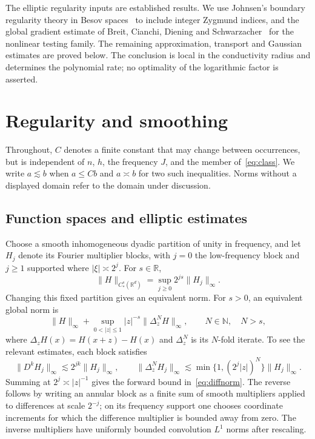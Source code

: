 \documentclass[11pt]{article}
\theoremstyle{remark}
\newcommand{\R}{\mathbb R}
\newcommand{\norm}[1]{\lVert #1\rVert}
\newcommand{\abs}[1]{\lvert #1\rvert}
\begin{document}
The elliptic regularity inputs are established results. We use Johnsen's boundary regularity theory in Besov spaces~\cite[Theorem~5.2 and Corollary~1.2]{Johnsen} to include integer Zygmund indices, and the global gradient estimate of Breit, Cianchi, Diening and Schwarzacher~\cite[Corollary~2.7]{BCDS} for the nonlinear testing family. The remaining approximation, transport and Gaussian estimates are proved below. The conclusion is local in the conductivity radius and determines the polynomial rate; no optimality of the logarithmic factor is asserted.

\section{Regularity and smoothing}\label{sec:analytic}
Throughout, $C$ denotes a finite constant that may change between occurrences, but is independent of $n$, $h$, the frequency $J$, and the member of~\eqref{eq:class}. We write $a\lesssim b$ when $a\le Cb$ and $a\asymp b$ for two such inequalities. Norms without a displayed domain refer to the domain under discussion.

\subsection{Function spaces and elliptic estimates}
Choose a smooth inhomogeneous dyadic partition of unity in frequency, and let $H_j$ denote its Fourier multiplier blocks, with $j=0$ the low-frequency block and $j\ge1$ supported where $\abs{\xi}\asymp2^j$.  For $s\in\R$,
\[
 \norm{H}_{C_*^s(\R^d)}=\sup_{j\ge0}2^{js}\norm{H_j}_\infty.
\]
Changing this fixed partition gives an equivalent norm. For $s>0$, an equivalent global norm is
\begin{equation}\label{eq:diffnorm}
 \norm{H}_\infty+
 \sup_{0<\abs{z}\le1}\abs{z}^{-s}\norm{\Delta_z^N H}_\infty,
 \qquad N\in\mathbb N,\quad N>s,
\end{equation}
where $\Delta_zH(x)=H(x+z)-H(x)$ and $\Delta_z^N$ is its $N$-fold iterate. To see the relevant estimates, each block satisfies
\[
 \norm{D^kH_j}_\infty\lesssim2^{jk}\norm{H_j}_\infty,
 \qquad
 \norm{\Delta_z^NH_j}_\infty
 \lesssim\min\{1,(2^j\abs{z})^N\}\norm{H_j}_\infty.
\]
Summing at $2^j\asymp\abs{z}^{-1}$ gives the forward bound in~\eqref{eq:diffnorm}. The reverse follows by writing an annular block as a finite sum of smooth multipliers applied to differences at scale $2^{-j}$; on its frequency support one chooses coordinate increments for which the difference multiplier is bounded away from zero. The inverse multipliers have uniformly bounded convolution $L^1$ norms after rescaling.
\end{document}
